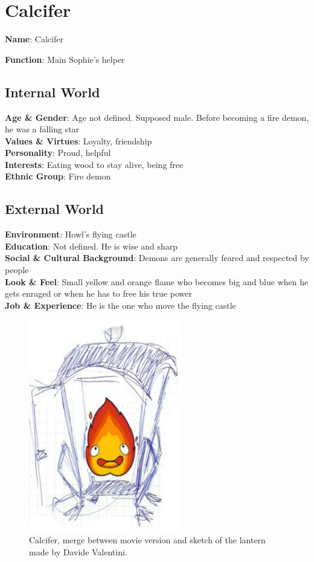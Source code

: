\section{Calcifer}

\begin{minipage}{0.5\textwidth}
\textbf{Name}: Calcifer

\textbf{Function}: Main Sophie's helper

\subsection{Internal World}

\textbf{Age \& Gender}: Age not defined. Supposed male. Before becoming a fire demon, he was a falling star \\
\textbf{Values \& Virtues}: Loyalty, friendship \\
\textbf{Personality}: Proud, helpful \\
\textbf{Interests}: Eating wood to stay alive, being free \\
\textbf{Ethnic Group}: Fire demon

\subsection{External World}
\textbf{Environment}: Howl's flying castle \\
\textbf{Education}: Not defined. He is wise and sharp \\
\textbf{Social \& Cultural Background}: Demons are generally feared and respected by people \\
\textbf{Look \& Feel}: Small yellow and orange flame who becomes big and  blue when he gets enraged or when he has to free his true power\\
\textbf{Job \& Experience}: He is the one who move the flying castle \\

\end{minipage}%
%
\hfill\begin{minipage}{0.4\textwidth}
  \begin{figure}[H]
    \includegraphics{Images/Characters/calcifer_portrait}
    \caption{Calcifer, merge between movie version and sketch of the lantern made by Davide Valentini.}
\end{figure}
\end{minipage}


